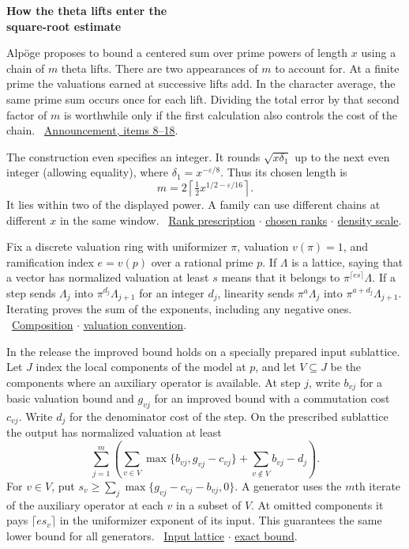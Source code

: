 \documentclass[11pt,letterpaper]{article}
\newcommand{\heading}[1]{{\sffamily\bfseries\fontsize{22}{25}\selectfont #1\par}\vspace{2pt}}
\newcommand{\subhead}[1]{\par\addvspace{4pt}{\sffamily\bfseries\large\color{accent}#1\par}\nobreak\vspace{-2pt}}
\newcommand{\links}[1]{\unskip\ {\small\sffamily\color{muted}#1}}
\newcommand{\repo}{https://github.com/TomasOrtega/RH/blob/a6ac91a412dcbaab31801355ec5707024a71bf65/extracted/lean/src/}
\newcommand{\src}[3]{\href{\repo#1.lean\#L#2}{#3}}
\newcommand{\growth}{Formalism/SharpRestriction/GrowthBounds/}
\newcommand{\eps}{\varepsilon}
\begin{document}
\heading{How the theta lifts enter the\\square-root estimate}
Alpöge proposes to bound a centered sum over prime powers of length \(x\) using a chain of \(m\) theta lifts. There are two appearances of \(m\) to account for. At a finite prime the valuations earned at successive lifts add. In the character average, the same prime sum occurs once for each lift. Dividing the total error by that second factor of \(m\) is worthwhile only if the first calculation also controls the cost of the chain. \links{\href{https://alpo.ge/remark.pdf\#page=4}{Announcement, items 8--18}.}

The construction even specifies an integer. It rounds \(\sqrt{x\delta_1}\) up to the next even integer (allowing equality), where \(\delta_1=x^{-\eps/8}\). Thus its chosen length is
\[
              m=2\left\lceil\tfrac12 x^{1/2-\eps/16}\right\rceil .
\]
It lies within two of the displayed power. A family can use different chains at different \(x\) in the same window. \links{\src{Development/AbelianVarietyTheory/Definitions/AutomorphicMembership/EvenCeil}{21}{Rank prescription} $\cdot$ \src{Development/AbelianVarietyTheory/Definitions/AutomorphicMembership/EventuallyThickCardLeCyclicOrder}{60}{chosen ranks} $\cdot$ \src{Formalism/LocalRingCardinality/DataParams\%E2\%82\%82}{45}{density scale}.}

\subhead{The calculation at one finite prime}
Fix a discrete valuation ring with uniformizer \(\pi\), valuation \(v(\pi)=1\), and ramification index \(e=v(p)\) over a rational prime \(p\). If \(\Lambda\) is a lattice, saying that a vector has normalized valuation at least \(s\) means that it belongs to \(\pi^{\lceil es\rceil}\Lambda\). If a step sends \(\Lambda_j\) into \(\pi^{d_j}\Lambda_{j+1}\) for an integer \(d_j\), linearity sends \(\pi^a\Lambda_j\) into \(\pi^{a+d_j}\Lambda_{j+1}\). Iterating proves the sum of the exponents, including any negative ones. \links{\src{\growth DataGChain}{85}{Composition} $\cdot$ \src{\growth FormalGroupSystem}{309}{valuation convention}.}

In the release the improved bound holds on a specially prepared input sublattice. Let \(J\) index the local components of the model at \(p\), and let \(V\subseteq J\) be the components where an auxiliary operator is available. At step \(j\), write \(b_{vj}\) for a basic valuation bound and \(g_{vj}\) for an improved bound with a commutation cost \(c_{vj}\). Write \(d_j\) for the denominator cost of the step. On the prescribed sublattice the output has normalized valuation at least
\[
  \sum_{j=1}^{m}\left(
     \sum_{v\in V}\max\{b_{vj},g_{vj}-c_{vj}\}
        +\sum_{v\notin V}b_{vj}-d_j\right).                         \tag{1}
\]
For \(v\in V\), put \(s_v\geq\sum_j\max\{g_{vj}-c_{vj}-b_{vj},0\}\). A generator uses the \(m\)th iterate of the auxiliary operator at each \(v\) in a subset of \(V\). At omitted components it pays \(\lceil e s_v\rceil\) in the uniformizer exponent of its input. This guarantees the same lower bound for all generators. \links{\src{\growth FormalGroupSystem}{361}{Input lattice} $\cdot$ \src{\growth FormalGroupSystem}{708}{exact bound}.}
\end{document}
